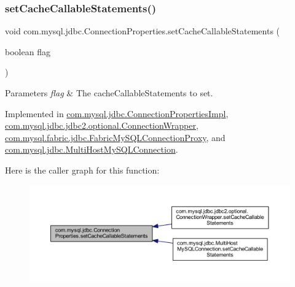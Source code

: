 \subsubsection{\texorpdfstring{set\+Cache\+Callable\+Statements()}{setCacheCallableStatements()}}
{\footnotesize\ttfamily void com.\+mysql.\+jdbc.\+Connection\+Properties.\+set\+Cache\+Callable\+Statements (\begin{DoxyParamCaption}\item[{boolean}]{flag }\end{DoxyParamCaption})}


\begin{DoxyParams}{Parameters}
{\em flag} & The cache\+Callable\+Statements to set. \\
\hline
\end{DoxyParams}


Implemented in \mbox{\hyperlink{classcom_1_1mysql_1_1jdbc_1_1_connection_properties_impl_a2e984472e42c6ff984d1548c7ba919cb}{com.\+mysql.\+jdbc.\+Connection\+Properties\+Impl}}, \mbox{\hyperlink{classcom_1_1mysql_1_1jdbc_1_1jdbc2_1_1optional_1_1_connection_wrapper_a0f60cd752383652f21a16f404ee107c2}{com.\+mysql.\+jdbc.\+jdbc2.\+optional.\+Connection\+Wrapper}}, \mbox{\hyperlink{classcom_1_1mysql_1_1fabric_1_1jdbc_1_1_fabric_my_s_q_l_connection_proxy_a47bfcdd9978dce9581d620b99e9cadff}{com.\+mysql.\+fabric.\+jdbc.\+Fabric\+My\+S\+Q\+L\+Connection\+Proxy}}, and \mbox{\hyperlink{classcom_1_1mysql_1_1jdbc_1_1_multi_host_my_s_q_l_connection_a2d8108c12a82b35523797323427b3b45}{com.\+mysql.\+jdbc.\+Multi\+Host\+My\+S\+Q\+L\+Connection}}.

Here is the caller graph for this function\+:\nopagebreak
\begin{figure}[H]
\begin{center}
\leavevmode
\includegraphics[width=350pt]{interfacecom_1_1mysql_1_1jdbc_1_1_connection_properties_ae88f31bc280f1a82f70847797a0a25e7_icgraph}
\end{center}
\end{figure}
\mbox{\label{interfacecom_1_1mysql_1_1jdbc_1_1_connection_properties_a990fe5790551ed49878ecc8bceb750a5}} 
